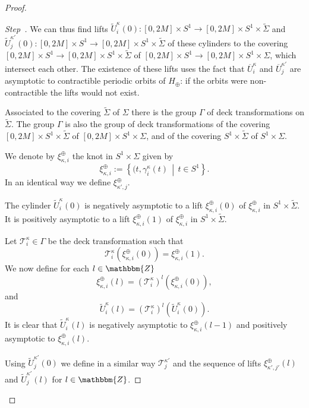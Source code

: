 \documentclass[AHL,Unicode,longabstracts,published]{cedram}
\newcommand{\Z}{\mathbbm{Z}}
\newcommand{\clT}{\mathcal{T}}
\newcounter{stepcount}
\newenvironment{step}{\refstepcounter{stepcount}\begin{proof}[Step~\thestepcount]}{\let\qed\relax\end{proof}}
\begin{document}
\begin{proof}
\begin{step}
We can thus find lifts $\widetilde{U}^\kappa_i(0) : [0,2M] \times S^1 \to [0,2M] \times S^1 \times \widetilde{\Sigma} $ and $\widetilde{U}^{\kappa'}_j(0) :[0,2M] \times S^1 \to [0,2M] \times S^1 \times \widetilde{\Sigma}$ of these cylinders to the covering $[0,2M] \times S^1 \to [0,2M] \times S^1 \times \widetilde{\Sigma}$ of $[0,2M] \times S^1 \to [0,2M] \times S^1 \times {\Sigma}$, which intersect each other. The existence of these lifts uses the fact that $\overline{U}^\kappa_i $ and $\overline{U}^{\kappa'}_j$ are asymptotic to contractible periodic orbits of $H_\oplus$: if the orbits were non-contractible the lifts would not exist.

Associated to the covering $\widetilde{\Sigma}$ of $\Sigma$ there is the group $\Gamma$ of deck transformations on $\widetilde{\Sigma}$. The group $\Gamma$ is also the group of deck transformations of the covering $[0,2M] \times S^1 \times \widetilde{\Sigma}$ of $[0,2M] \times S^1 \times {\Sigma}$, and of the covering $S^1 \times \widetilde{\Sigma}$ of $ S^1 \times {\Sigma}$.

We denote by $\xi^{\oplus}_{\kappa,i}$ the knot in $S^1 \times \Sigma$ given by
\[
\xi^{\oplus}_{\kappa,i}:= \left\{(t,\gamma^\kappa_i(t) \, \middle| \, t \in S^1\right\}.
\]
In an identical way we define $\xi^{\oplus}_{\kappa',j}$.

The cylinder $\widetilde{U}^\kappa_i(0)$ is negatively asymptotic to a lift $\xi^{\oplus}_{\kappa,i}(0)$ of $\xi^{\oplus}_{\kappa,i}$ in $S^1 \times \widetilde{\Sigma}$. It is positively asymptotic to a lift $\xi^{\oplus}_{\kappa,i}(1)$ of $\xi^{\oplus}_{\kappa,i}$ in $S^1 \times \widetilde{\Sigma}$.

Let $\clT^\kappa_i \in \Gamma$ be the deck transformation such that
\[
\clT^\kappa_i\left(\xi^{\oplus}_{\kappa,i}(0)\right)= \xi^{\oplus}_{\kappa,i}(1).
\]
We now define for each $l\in \Z$
\begin{equation}
\xi^{\oplus}_{\kappa,i}(l) = \left(\clT^\kappa_i\right)^l(\xi^{\oplus}_{\kappa,i}(0)),
\end{equation}
and
\begin{equation}
\widetilde{U}^\kappa_i(l)= (\clT^\kappa_i)^l\left(\widetilde{U}^\kappa_i(0)\right).
\end{equation}
It is clear that $\widetilde{U}^\kappa_i(l)$ is negatively asymptotic to $\xi^{\oplus}_{\kappa,i}(l-1)$ and positively asymptotic to $\xi^{\oplus}_{\kappa,i}(l)$.

Using $\widetilde{U}^{\kappa'}_j(0)$ we define in a similar way $\clT^{\kappa'}_j$ and the sequence of lifts $\xi^{\oplus}_{\kappa',j'}(l)$ and $\widetilde{U}^{\kappa'}_j(l)$ for $l\in \Z$.
\end{step}


\end{proof}
\end{document}
